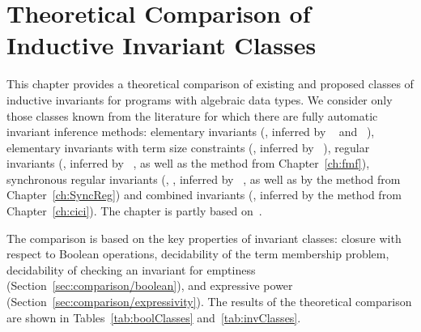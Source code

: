 \chapter{Theoretical Comparison of Inductive Invariant Classes}\label{ch:comparison}

This chapter provides a theoretical comparison of existing and proposed classes of inductive invariants for programs with algebraic data types.
We consider only those classes known from the literature for which there are fully automatic invariant inference methods: elementary invariants (\elemclass{}, inferred by \spacer{}~\cite{komuravelli2016smt} and \hoice{}~\cite{10.1007/978-3-030-02768-1_8}), elementary invariants with term size constraints (\sizeelemclass{}, inferred by \eldarica{}~\cite{8603013}), regular invariants (\regclass{}, inferred by \rchc{}~\cite{haude2020}, as well as the method from Chapter~\cref{ch:fmf}), synchronous regular invariants (\syncRegFlatClass{}, \syncRegFullClass{}, inferred by \rchc{}~\cite{haude2020}, as well as by the method from Chapter~\cref{ch:SyncReg}) and combined invariants (\regelemclass{}, inferred by the method from Chapter~\cref{ch:cici}).
The chapter is partly based on~\cite{10.1145/3453483.3454055}.


The comparison is based on the key properties of invariant classes: closure with respect to Boolean operations, decidability of the term membership problem, decidability of checking an invariant for emptiness (Section~\cref{sec:comparison/boolean}), and expressive power (Section~\cref{sec:comparison/expressivity}).
The results of the theoretical comparison are shown in Tables~\cref{tab:boolClasses} and~\cref{tab:invClasses}.


